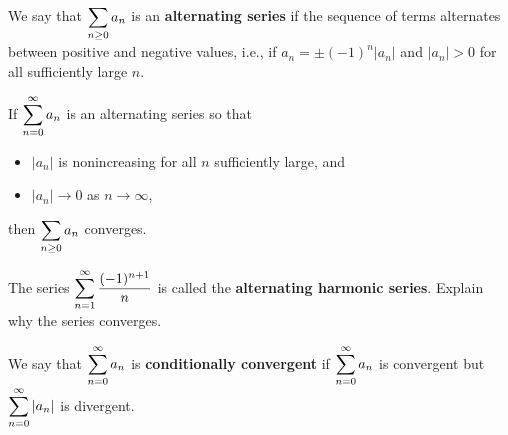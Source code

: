 \setcounter{chapter}{10}
\setcounter{section}{6}
\setcounter{theorem}{0}
\setcounter{equation}{0}


\begin{definition}
We say that $\displaystyle\sum_{n\ge 0} a_n$ is an \textbf{alternating series} if the sequence of terms alternates between positive and negative values, 
i.e., if $a_n = \pm(-1)^n|a_n|$ and $|a_n|>0$ for all sufficiently large $n$.
\end{definition}

\begin{theorem}
If $\displaystyle\sum_{n=0}^\infty a_n$ is an alternating series so that
\begin{itemize}
\item $|a_n|$ is nonincreasing for all $n$ sufficiently large, and
\item $|a_n|\to 0$ as $n\to\infty$,
\end{itemize}
then $\displaystyle\sum_{n\ge 0} a_n$ converges.
\end{theorem}

\begin{example}
The series $\displaystyle\sum_{n=1}^\infty\frac{(-1)^{n+1}}{n}$ is called the \textbf{alternating harmonic series}.
Explain why the series converges.
\end{example}
\ifdefined\SOLUTION
{}
\fi

\vfill

\begin{definition}
We say that $\displaystyle\sum_{n=0}^\infty a_n$ is \textbf{conditionally convergent} 
if $\displaystyle\sum_{n=0}^\infty a_n$ is convergent but $\displaystyle\sum_{n=0}^\infty |a_n|$ is divergent. 
\end{definition}

\newpage

